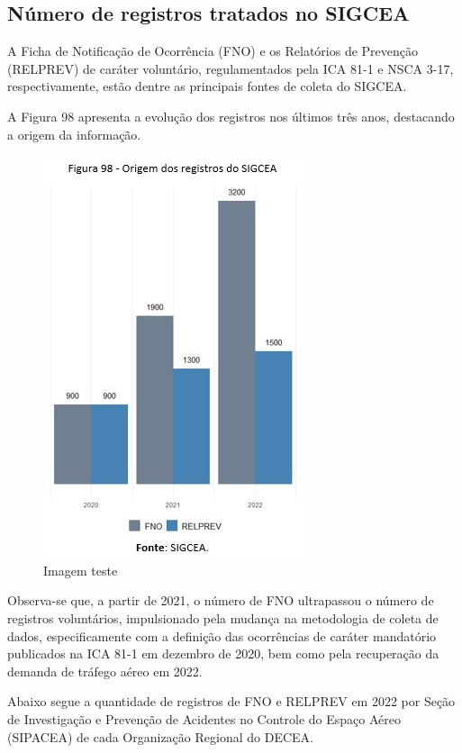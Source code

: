 \documentclass[
]{book}
\begin{document}
\hypertarget{nuxfamero-de-registros-tratados-no-sigcea}{%
\subsection{Número de registros tratados no SIGCEA}\label{nuxfamero-de-registros-tratados-no-sigcea}}

A Ficha de Notificação de Ocorrência (FNO) e os Relatórios de Prevenção (RELPREV) de caráter voluntário, regulamentados pela ICA 81-1 e NSCA 3-17, respectivamente, estão dentre as principais fontes de coleta do SIGCEA.

A Figura 98 apresenta a evolução dos registros nos últimos três anos, destacando a origem da informação.

\begin{figure}
\centering
\includegraphics{imagens/fig85.jpg}
\caption{Imagem teste}
\end{figure}

Observa-se que, a partir de 2021, o número de FNO ultrapassou o número de registros voluntários, impulsionado pela mudança na metodologia de coleta de dados, especificamente com a definição das ocorrências de caráter mandatório publicados na ICA 81-1 em dezembro de 2020, bem como pela recuperação da demanda de tráfego aéreo em 2022.

Abaixo segue a quantidade de registros de FNO e RELPREV em 2022 por Seção de Investigação e Prevenção de Acidentes no Controle do Espaço Aéreo (SIPACEA) de cada Organização Regional do DECEA.
\end{document}

